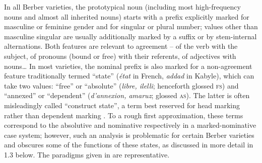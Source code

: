 \documentclass[output=paper]{langscibook}
\begin{document}
\begin{styleStandarduser}
In all Berber varieties, the prototypical noun (including most high-frequency nouns and almost all inherited nouns) starts with a prefix explicitly marked for masculine or feminine gender and for singular or plural number; values other than masculine singular are usually additionally marked by a suffix or by stem-internal alternations. Both features are relevant to agreement – of the verb with the subject, of pronouns (bound or free) with their referents, of adjectives with nouns… In most varieties, the nominal prefix is also marked for a non-agreement feature traditionally termed “state” (\textit{état} in French, \textit{addad} in Kabyle), which can take two values: “free” or “absolute” (\textit{libre, ilelli}; henceforth glossed \textsc{fs}) and “annexed” or “dependent” (\textit{d’annexion, amaruz}; glossed \textsc{as}). The latter is often misleadingly called “construct state”, a term best reserved for head marking rather than dependent marking \citep{Creissels2009a}. To a rough first approximation, these terms correspond to the absolutive and nominative respectively in a marked-nominative case system; however, such an analysis is problematic for certain Berber varieties and obscures some of the functions of these states, as discussed in more detail in 1.3 below. The paradigms given in  are representative.
\end{styleStandarduser}

\begin{styleLangsciTableHeading}%
\begin{table}
\caption{Paradigm of ‘old person’  in Kabyle and Tamasheq.}
\label{tab:key:1}
\end{table}\end{styleLangsciTableHeading}
\end{document}

